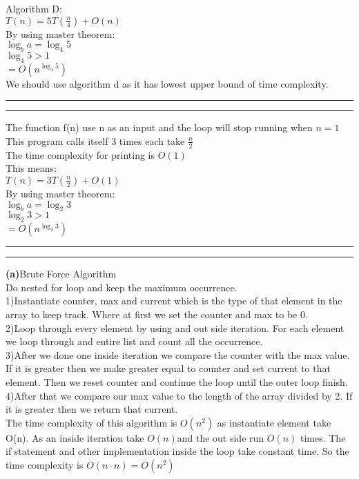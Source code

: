 \documentclass[a4paper, 11pt]{article}
\newcommand{\question}[2] {\vspace{.25in} \hrule\vspace{0.5em}
\noindent{\bf #1: #2} \vspace{0.5em}
\hrule \vspace{.10in}}
\renewcommand{\part}[1] {\vspace{.10in} {\bf (#1)}}
\begin{document}
Algorithm D:\\
$T(n)=5T(\frac{n}{4})+O(n)$\\
By using master theorem:\\
$\log_{b} a = \log_{4} 5$\\
$\log_{4} 5 > 1$\\
$=O(n^{\log_{4} 5})$\\
We should use algorithm d as it has lowest upper bound of time complexity.
\question{3}{Problem3}
The function f(n) use n as an input and the loop will stop running when $n=1$\\
This program calls itself 3 times each take $\frac{n}{2}$\\
The time complexity for printing is $O(1)$\\
This means:\\
$T(n)=3T(\frac{n}{2})+O(1)$\\
By using master theorem:\\
$\log_{b} a = \log_2 3$\\
$\log_2 3 > 1$\\
$=O(n^{\log_{2} 3})$

\question{4}{Problem4}
\part{a}{Brute Force Algorithm}\\
Do nested for loop and keep the maximum occurrence.\\ 
1)Instantiate counter, max and current which is the type of that element in the array to keep track. Where at first we set the counter and max to be 0.\\ 
2)Loop through every element by using and out side iteration. For each element we loop through and entire list and count all the occurrence.\\
3)After we done one inside iteration we compare the counter with the max value. If it is greater then we make greater equal to counter and set current to that element. Then we reset counter and continue the loop until the outer loop finish.\\
4)After that we compare our max value to the length of the array divided by 2. If it is greater then we return that current.\\
The time complexity of this algorithm is $O(n^{2})$ as instantiate element take O(n). As an inside iteration take $O(n)$and the out side run $O(n)$ times. The if statement and other implementation inside the loop take constant time. So the time complexity is $O(n \cdot n) = O(n^{2})$
\end{document}
